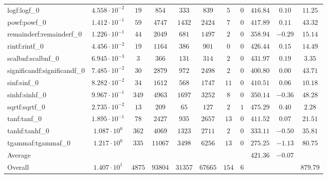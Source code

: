 \begin{tabular}{|l|c|c|c|c|c|c|c|c|c|c|}
logf:logf\_0                 & $ 4.558 \cdot 10^{-2} $ & $ 19     $ & $ 854   $ & $ 333   $ & $ 839   $ & $ 5   $ & $ 0 $ & $ 416.84      $ & $ 0.10    $ & $ 11.25   $ \\
powf:powf\_0                 & $ 1.412 \cdot 10^{-1} $ & $ 59     $ & $ 4747  $ & $ 1432  $ & $ 2424  $ & $ 7   $ & $ 0 $ & $ 417.89      $ & $ 0.11    $ & $ 43.32   $ \\
remainderf:remainderf\_0     & $ 1.226 \cdot 10^{-1} $ & $ 44     $ & $ 2049  $ & $ 681   $ & $ 1497  $ & $ 2   $ & $ 0 $ & $ 358.94      $ & $ -0.29   $ & $ 15.14   $ \\
rintf:rintf\_0               & $ 4.456 \cdot 10^{-2} $ & $ 19     $ & $ 1164  $ & $ 386   $ & $ 901   $ & $ 0   $ & $ 0 $ & $ 426.44      $ & $ 0.15    $ & $ 14.49   $ \\
scalbnf:scalbnf\_0           & $ 6.945 \cdot 10^{-3} $ & $ 3      $ & $ 366   $ & $ 131   $ & $ 314   $ & $ 2   $ & $ 0 $ & $ 431.97      $ & $ 0.19    $ & $ 3.35    $ \\
significandf:significandf\_0 & $ 7.485 \cdot 10^{-2} $ & $ 30     $ & $ 2879  $ & $ 972   $ & $ 2498  $ & $ 2   $ & $ 0 $ & $ 400.80      $ & $ 0.00    $ & $ 43.71   $ \\
sinf:sinf\_0                 & $ 8.282 \cdot 10^{-2} $ & $ 34     $ & $ 1612  $ & $ 568   $ & $ 1747  $ & $ 11  $ & $ 0 $ & $ 410.51      $ & $ 0.06    $ & $ 10.18   $ \\
sinhf:sinhf\_0               & $ 9.967 \cdot 10^{-1} $ & $ 349    $ & $ 4963  $ & $ 1697  $ & $ 3252  $ & $ 8   $ & $ 0 $ & $ 350.14      $ & $ -0.36   $ & $ 48.28   $ \\
sqrtf:sqrtf\_0               & $ 2.735 \cdot 10^{-2} $ & $ 13     $ & $ 209   $ & $ 65    $ & $ 127   $ & $ 2   $ & $ 1 $ & $ 475.29      $ & $ 0.40    $ & $ 2.28    $ \\
tanf:tanf\_0                 & $ 1.895 \cdot 10^{-1} $ & $ 78     $ & $ 2427  $ & $ 935   $ & $ 2657  $ & $ 13  $ & $ 0 $ & $ 411.52      $ & $ 0.07    $ & $ 21.51   $ \\
tanhf:tanhf\_0               & $ 1.087 \cdot 10^{0}  $ & $ 362    $ & $ 4069  $ & $ 1323  $ & $ 2711  $ & $ 2   $ & $ 0 $ & $ 333.11      $ & $ -0.50   $ & $ 35.81   $ \\
tgammaf:tgammaf\_0           & $ 1.217 \cdot 10^{0}  $ & $ 335    $ & $ 11067 $ & $ 3498  $ & $ 6256  $ & $ 13  $ & $ 0 $ & $ 275.25      $ & $ -1.13   $ & $ 80.75   $ \\
\hline
Average                      & $                     $ & $        $ & $       $ & $       $ & $       $ & $     $ & $   $ & $ 421.36      $ & $ -0.07   $ & $         $ \\
\hline
Overall                      & $ 1.407 \cdot 10^{1}  $ & $ 4875   $ & $ 93804 $ & $ 31357 $ & $ 67665 $ & $ 154 $ & $ 6 $ & $             $ & $         $ & $ 879.79  $ \\
\hline
\end{tabular}
